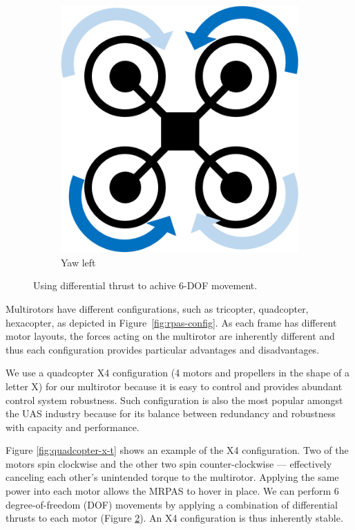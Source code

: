 \begin{figure}[h]
	~
	\begin{subfigure}[b]{0.3\textwidth}
		\centering
		\includegraphics[scale=0.4]{img/drone_x_yaw}
		\caption{Yaw left}
		\label{fig:x-yaw}
	\end{subfigure}
	
	\caption{Using differential thrust to achive 6-DOF movement. }
	\label{fig:rpas_6dof}
\end{figure}

Multirotors have different configurations, such as tricopter, quadcopter, hexacopter, as depicted in Figure~\ref{fig:rpas-config}. As each frame has different motor layouts, the forces acting on the multirotor are inherently different and thus each configuration provides particular advantages and disadvantages.

We use a quadcopter X4 configuration (4 motors and propellers in the shape of a letter X) for our multirotor because it is easy to control and provides abundant control system robustness. Such configuration is also the most popular amongst the UAS industry because for its balance between redundancy and robustness with capacity and performance.

Figure \ref{fig:quadcopter-x-t} shows an example of the X4 configuration. Two of the motors spin clockwise and the other two spin counter-clockwise --- effectively canceling each other's unintended torque to the multirotor. Applying the same power into each motor allows the MRPAS to hover in place. We can perform 6 degree-of-freedom (DOF) movements by applying a combination of differential thrusts to each motor (Figure \ref{fig:rpas_6dof}). An X4 configuration is thus inherently stable.

